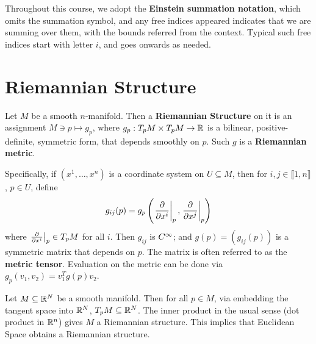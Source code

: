 \documentclass{article}
\begin{document}

\tableofcontents
\newpage

\begin{notation}
    Throughout this course, we adopt the \textbf{Einstein summation notation}, which omits the summation symbol, and any free indices appeared indicates that we are summing over them, with the bounds referred from the context. Typical such free indices start with letter $i$, and goes onwards as needed.
\end{notation}

\section{Riemannian Structure}

\begin{definition}
    Let $M$ be a smooth $n$-manifold. Then a \textbf{Riemannian Structure} on it is an assignment $M \ni p \mapsto g_p$, where $g_p: T_p M \times T_p M \to \mathbb{R}$ is a bilinear, positive-definite, symmetric form, that depends smoothly on $p$. Such $g$ is a \textbf{Riemannian metric}. 
    
    Specifically, if $(x^1, \dots, x^n)$ is a coordinate system on $U \subseteq M$, then for $i, j \in \llbracket 1, n \rrbracket$, $p \in U$, define
    \[
        g_{ij}(p) = g_p\left(\left.\frac{\partial }{\partial x^i}\right|_{p}, \left.\frac{\partial }{\partial x^j}\right|_{p}\right)
    \]
    where $\left.\frac{\partial }{\partial x^i}\right|_{p} \in T_p M$ for all $i$. Then $g_{ij}$ is $C^{\infty}$; and $g(p) = (g_{ij}(p))$ is a symmetric matrix that depends on $p$. The matrix is often referred to as the \textbf{metric tensor}. Evaluation on the metric can be done via $g_p(v_1, v_2) = v_1^T g(p) v_2$.
\end{definition}

\begin{example}
    Let $M \subseteq \mathbb{R}^N$ be a smooth manifold. Then for all $p \in M$, via embedding the tangent space into $\mathbb{R}^N$, $T_p M \subseteq \mathbb{R}^N$. The inner product in the usual sense (dot product in $\mathbb{R}^n$) gives $M$ a Riemannian structure. This implies that Euclidean Space obtains a Riemannian structure. 
\end{example}
\end{document}
